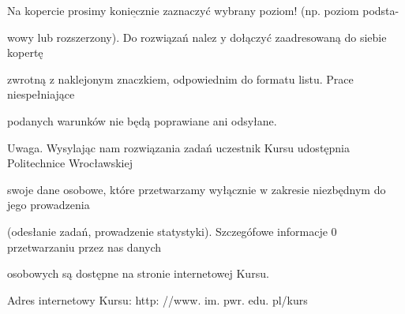 \documentclass[a4paper,12pt]{article}
\begin{document}
Na kopercie prosimy $\underline{\mathrm{k}\mathrm{o}\mathrm{n}\mathrm{i}\mathrm{e}\mathrm{c}\mathrm{z}\mathrm{n}\mathrm{i}\mathrm{e}}$ zaznaczyć wybrany poziom! (np. poziom podsta-

wowy lub rozszerzony). Do rozwiązań nalez $\mathrm{y}$ dołączyć zaadresowaną do siebie kopertę

zwrotną $\mathrm{z}$ naklejonym znaczkiem, odpowiednim do formatu listu. Prace niespełniające

podanych warunków nie będą poprawiane ani odsyłane.

Uwaga. Wysylając nam rozwiązania zadań uczestnik Kursu udostępnia Politechnice Wrocławskiej

swoje dane osobowe, które przetwarzamy wyłącznie $\mathrm{w}$ zakresie niezbędnym do jego prowadzenia

(odesłanie zadań, prowadzenie statystyki). Szczegófowe informacje $0$ przetwarzaniu przez nas danych

osobowych są dostępne na stronie internetowej Kursu.

Adres internetowy Kursu: http: //www. im. pwr. edu. pl/kurs
\end{document}
